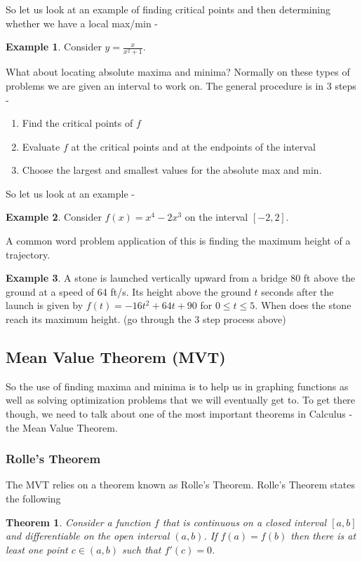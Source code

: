 \documentclass[12pt,reqno]{article}
\newtheorem{Theorem}{Theorem}
\theoremstyle{definition}
\newtheorem*{Example}{Example}
\begin{document}
So let us look at an example of finding critical points and then determining whether we have a local max/min - 
\begin{Example}
	Consider $y = \frac{x}{x^2 + 1}$. 
\end{Example}

What about locating absolute maxima and minima? Normally on these types of problems we are given an interval to work on. The general procedure is in 3 steps - 
\begin{enumerate}
	\item[1.] Find the critical points of $f$ 
	\item[2.] Evaluate $f$ at the critical points and at the endpoints of the interval 
	\item[3.] Choose the largest and smallest values for the absolute max and min. 
\end{enumerate}

So let us look at an example - 
\begin{Example}
	Consider $f(x) = x^4 - 2x^3$ on the interval $[-2, 2]$. 
\end{Example}

A common word problem application of this is finding the maximum height of a trajectory. 
\begin{Example}
	A stone is launched vertically upward from a bridge 80 ft above the ground at a speed of 64 ft/s. Its height above the ground $t$ seconds after the launch is given by $f(t) = -16t^2 + 64t + 90$ for $0 \leq t \leq 5$. When does the stone reach its maximum height. (go through the 3 step process above)
\end{Example}


\subsection{Mean Value Theorem (MVT)} 

So the use of finding maxima and minima is to help us in graphing functions as well as solving optimization problems that we will eventually get to. To get there though, we need to talk about one of the most important theorems in Calculus - the Mean Value Theorem. 

\subsubsection{Rolle's Theorem} 

The MVT relies on a theorem known as Rolle's Theorem. Rolle's Theorem states the following 
\begin{Theorem}
	Consider a function $f$ that is continuous on a closed interval $[a, b]$ and differentiable on the open interval $(a, b)$. If $f(a) = f(b)$ then there is at least one point $c \in (a, b)$ such that $f'(c) = 0$. 
\end{Theorem}
\end{document}
